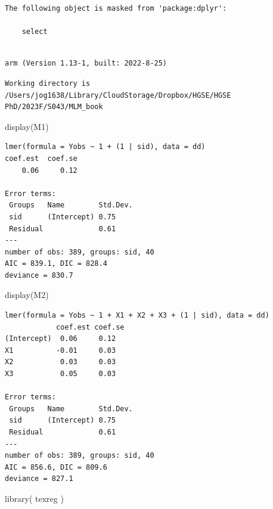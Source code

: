 \documentclass[
  letterpaper,
  DIV=11,
  numbers=noendperiod]{scrreprt}
\newenvironment{Shaded}{\begin{snugshade}}{\end{snugshade}}
\newcommand{\FunctionTok}[1]{\textcolor[rgb]{0.02,0.16,0.49}{#1}}
\newcommand{\NormalTok}[1]{\textcolor[rgb]{0.00,0.44,0.13}{#1}}
\begin{document}
\begin{verbatim}
The following object is masked from 'package:dplyr':

    select
\end{verbatim}

\begin{verbatim}

arm (Version 1.13-1, built: 2022-8-25)
\end{verbatim}

\begin{verbatim}
Working directory is /Users/jog1638/Library/CloudStorage/Dropbox/HGSE/HGSE PhD/2023F/S043/MLM_book
\end{verbatim}

\begin{Shaded}
\begin{Highlighting}[]
\FunctionTok{display}\NormalTok{(M1)}
\end{Highlighting}
\end{Shaded}

\begin{verbatim}
lmer(formula = Yobs ~ 1 + (1 | sid), data = dd)
coef.est  coef.se 
    0.06     0.12 

Error terms:
 Groups   Name        Std.Dev.
 sid      (Intercept) 0.75    
 Residual             0.61    
---
number of obs: 389, groups: sid, 40
AIC = 839.1, DIC = 828.4
deviance = 830.7 
\end{verbatim}

\begin{Shaded}
\begin{Highlighting}[]
\FunctionTok{display}\NormalTok{(M2)}
\end{Highlighting}
\end{Shaded}

\begin{verbatim}
lmer(formula = Yobs ~ 1 + X1 + X2 + X3 + (1 | sid), data = dd)
            coef.est coef.se
(Intercept)  0.06     0.12  
X1          -0.01     0.03  
X2           0.03     0.03  
X3           0.05     0.03  

Error terms:
 Groups   Name        Std.Dev.
 sid      (Intercept) 0.75    
 Residual             0.61    
---
number of obs: 389, groups: sid, 40
AIC = 856.6, DIC = 809.6
deviance = 827.1 
\end{verbatim}

\begin{Shaded}
\begin{Highlighting}[]
\FunctionTok{library}\NormalTok{( texreg )}
\end{Highlighting}
\end{Shaded}
\end{document}
